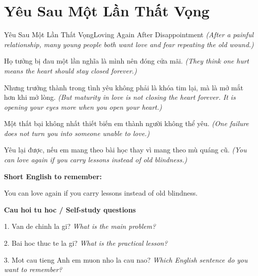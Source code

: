 \section{Yêu Sau Một Lần Thất Vọng}
\begin{truyen}{Yêu Sau Một Lần Thất Vọng}{Loving Again After Disappointment}
\textit{(After a painful relationship, many young people both want love and fear repeating the old wound.)}

Họ tưởng bị đau một lần nghĩa là mình nên đóng cửa mãi.
\textit{(They think one hurt means the heart should stay closed forever.)}

Nhưng trưởng thành trong tình yêu không phải là khóa tim lại, mà là mở mắt hơn khi mở lòng.
\textit{(But maturity in love is not closing the heart forever. It is opening your eyes more when you open your heart.)}

Một thất bại không nhất thiết biến em thành người không thể yêu.
\textit{(One failure does not turn you into someone unable to love.)}

\end{truyen}

\begin{baihoc}
Yêu lại được, nếu em mang theo bài học thay vì mang theo mù quáng cũ.
\textit{(You can love again if you carry lessons instead of old blindness.)}
\end{baihoc}

\begin{ghinhoanh}
\textbf{Short English to remember:}

You can love again if you carry lessons instead of old blindness.

\end{ghinhoanh}

\begin{tuhocnhanh}
\textbf{Cau hoi tu hoc / Self-study questions}

1. Van de chinh la gi? \textit{What is the main problem?}

2. Bai hoc thuc te la gi? \textit{What is the practical lesson?}

3. Mot cau tieng Anh em muon nho la cau nao? \textit{Which English sentence do you want to remember?}
\end{tuhocnhanh}
\ngancach

